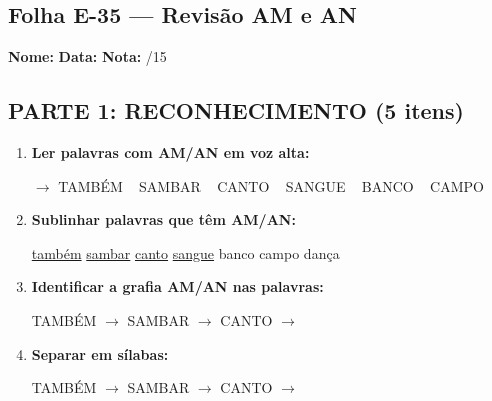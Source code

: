 \subsection{Folha E-35 --- Revisão AM e AN}
\begin{exercicio}



\noindent\textbf{Nome:} \underline{\hspace{3.2cm}} \quad \textbf{Data:} \underline{\hspace{1.6cm}} \quad \textbf{Nota:} \underline{\hspace{0.9cm}}/15


\subsection*{PARTE 1: RECONHECIMENTO (5 itens)}

\begin{enumerate}

  \item \textbf{Ler palavras com AM/AN em voz alta:}
  \begin{center}
  $\rightarrow$ TAMBÉM ~ SAMBAR ~ CANTO ~ SANGUE ~ BANCO ~ CAMPO
  \end{center}

  \item \textbf{Sublinhar palavras que têm AM/AN:}

\begin{center}
  \uline{também} \quad \uline{sambar} \quad \uline{canto} \quad \uline{sangue} \quad banco \quad campo \quad dança
\end{center}

  \item \textbf{Identificar a grafia AM/AN nas palavras:}
  \begin{center}
  TAMBÉM $\rightarrow$ \underline{\hspace{1cm}} \quad SAMBAR $\rightarrow$ \underline{\hspace{1cm}} \quad CANTO $\rightarrow$ \underline{\hspace{1cm}}
  \end{center}

  \item \textbf{Separar em sílabas:}
  \begin{center}
  TAMBÉM $\rightarrow$ \underline{\hspace{1.2cm}} \quad SAMBAR $\rightarrow$ \underline{\hspace{1.2cm}} \quad CANTO $\rightarrow$ \underline{\hspace{1.2cm}}
  \end{center}


\end{enumerate}
\end{exercicio}
